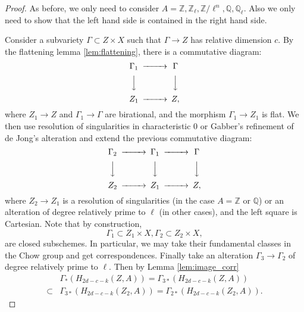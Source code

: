 \documentclass{amsart}
\theoremstyle{definition}
\theoremstyle{remark}
\newcommand{\mbb}{\mathbb}
\newcommand{\QQ}{\mbb{Q}}
\newcommand{\ZZ}{\mbb{Z}}
\begin{document}
\begin{proof}
As before, we only need to consider $A=\ZZ, \ZZ_\ell, \ZZ/\ell^n, \QQ, \QQ_\ell$. Also we only need to show that the left hand side is contained in the right hand side.

Consider a subvariety $\Gamma\subset Z \times X$ such that $\Gamma \to Z$ has relative dimension $c$.
By the flattening lemma \ref{lem:flattening}, there is a commutative diagram:
    \[
    \begin{CD}
        \Gamma_1 @>>> \Gamma\\
         @VVV @VVV\\
         Z_1 @>>> Z,
    \end{CD}
    \]
    where $Z_1 \to Z$ and $\Gamma_1 \to \Gamma$ are birational, and the morphism $\Gamma_1 \to Z_1$ is flat.
We then use resolution of singularities in characteristic $0$ or Gabber's refinement of de Jong's alteration and extend the previous commutative diagram:
    \[
    \begin{CD}
        \Gamma_2 @>>>\Gamma_1 @>>> \Gamma\\
        @VVV @VVV @VVV\\
        Z_2 @>>> Z_1 @>>> Z,
    \end{CD}
    \]
    where  $Z_2 \to Z_1$ is a resolution of singularities (in the case $A=\ZZ$ or $\QQ$) or an alteration of degree relatively prime to $\ell$ (in other cases), and the left square is Cartesian.
    Note that by construction,
    \[
    \Gamma_1 \subset Z_1 \times X, \Gamma_2 \subset Z_2 \times X,
    \]
    are closed subschemes. In particular, we may take their fundamental classes in the Chow group and get correspondences.
    Finally take an alteration $\Gamma_3 \to \Gamma_2$ of degree relatively prime to $\ell$.
    Then by Lemma \ref{lem:image_corr}
    \begin{align*}
        &\Gamma_*(H_{2d-c-k}(Z, A))= \Gamma_{3*}(H_{2d-c-k}(Z, A))\\
        \subset&\Gamma_{3*}(H_{2d-c-k}(Z_2, A))=\Gamma_{2*}(H_{2d-c-k}(Z_2, A)).
    \end{align*}
\end{proof}
\end{document}
